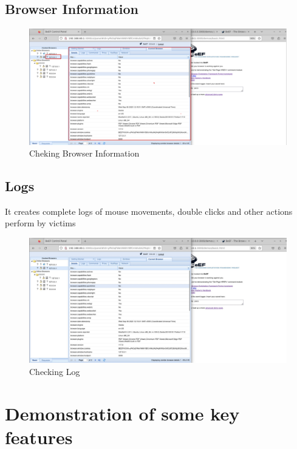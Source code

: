 \documentclass{report}
\begin{document}
\section{Browser Information}
\begin{figure}[!htbp]
    \centering
    \includegraphics[width=\textwidth]{techDesign/1.png}
    \caption{Cheking Browser Information}
    \label{fig:tech1}
\end{figure}
\vfill\null

\pagebreak

\section{Logs}
It creates complete logs of mouse movements, double clicks and other actions perform by victims
\begin{figure}[!htbp]
    \centering
    \includegraphics[width=\textwidth]{techDesign/2.png}
    \caption{Checking Log}
    \label{fig:tech2}
\end{figure}


\pagebreak


\chapter{Demonstration of some key features}
\end{document}
